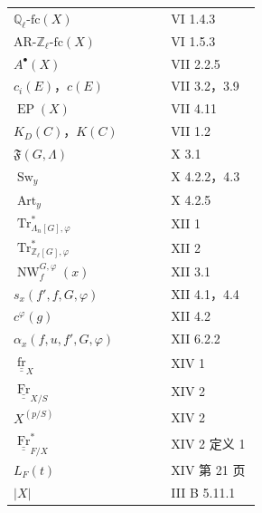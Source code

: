 \begin{longtable}{@{}p{0.61\linewidth}p{0.35\linewidth}@{}}
$\mathbb Q_\ell\text{-}\mathrm{fc}(X)$ & VI 1.4.3\\
$\mathrm{AR}\text{-}\mathbb Z_\ell\text{-}\mathrm{fc}(X)$ & VI 1.5.3\\
$A^\bullet(X)$ & VII 2.2.5\\
$c_i(E)$，$c(E)$ & VII 3.2，3.9\\
$\operatorname{EP}(X)$ & VII 4.11\\
$K_D(C)$，$K(C)$ & VII 1.2\\
$\mathfrak F(G,\Lambda)$ & X 3.1\\
$\operatorname{Sw}_y$ & X 4.2.2，4.3\\
$\operatorname{Art}_y$ & X 4.2.5\\
$\operatorname{Tr}^*_{\Lambda_n[G],\varphi}$ & XII 1\\
$\operatorname{Tr}^*_{\mathbb Z_\ell[G],\varphi}$ & XII 2\\
$\operatorname{NW}^{G,\varphi}_f(x)$ & XII 3.1\\
$s_x(f',f,G,\varphi)$ & XII 4.1，4.4\\
$c^\varphi(g)$ & XII 4.2\\
$\alpha_x(f,u,f',G,\varphi)$ & XII 6.2.2\\
$\underline{\underline{\operatorname{fr}}}_X$ & XIV 1\\
$\underline{\underline{\operatorname{Fr}}}_{X/S}$ & XIV 2\\
$X^{(p/S)}$ & XIV 2\\
$\underline{\underline{\operatorname{Fr}}}^{*}_{F/X}$ & XIV 2 定义 1\\
$L_F(t)$ & XIV 第 21 页\\
$|X|$ & III B 5.11.1
\end{longtable}
